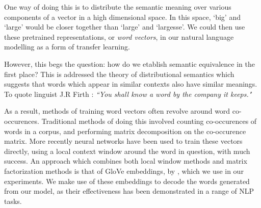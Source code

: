 One way of doing this is to distribute the semantic meaning over various components of a vector in a high dimensional space. In this space, `big' and `large' would be closer together than `large' and `largesse'. We could then use these pretrained representations, or \textit{word vectors}, in our natural language modelling as a form of transfer learning. \citep{hinton_parallel_1986}

However, this begs the question: how do we etablish semantic equivalence in the first place? This is addressed the theory of distributional semantics which suggests that words which appear in similar contexts also have similar meanings. \citep{harris_distributional_1954}
To quote linguist J.R Firth : \textit{``You shall know a word by the company it keeps."} \citep{firth_synopsis_1957}

As a result, methods of training word vectors often revolve around word co-occurences.  Traditional methods of doing this involved counting co-occurences of words in a corpus, and performing matrix decomposition on the co-occurence matrix. \citep{deerwester_indexing_1990} More recently neural networks have been used to train these vectors directly, using a local context window around the word in question, with much success. \citep{mikolov_efficient_2013,mikolov_distributed_2013} An approach which combines both local window methods and matrix factorization methods is that of GloVe embeddings, by \citet{pennington_glove_2014}, which we use in our experiments. 
We make use of these embeddings to decode the words generated from our model, as their effectiveness has been demonstrated in a range of NLP tasks. \cite{young_recent_2017}





